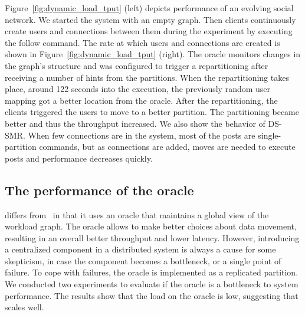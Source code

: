 Figure~\ref{fig:dynamic_load_tput} (left) depicts performance of an evolving social network.  
We started the system with an empty graph. Then clients
continuously create users and connections between them during the experiment
by executing the follow command.
The rate at which users and connections are created is shown in Figure~\ref{fig:dynamic_load_tput} (right).
The oracle monitors changes in the
graph's structure and was configured to trigger a repartitioning after receiving a number of hints
from the partitions.
When the repartitioning takes place, around 122 seconds into the execution, the previously random user mapping got a better location from the oracle.
After the repartitioning, the clients triggered the users to move to a better partition. 
The partitioning became better and thus the throughput increased.
We also show the behavior of DS-SMR.
When few connections are in the system, most of the posts are single-partition commands, but as connections are added, moves are needed to execute posts and performance decreases quickly.


\subsection{The performance of the oracle}

\dynastar differs from \dssmr\ in that it uses an oracle
that maintains a global view of the workload graph. The oracle allows
\dynastar to make better choices about data movement, resulting in an overall
better throughput and lower latency. However, introducing a centralized
component in a distributed system is always a cause for some skepticism,
in case the component becomes a bottleneck, or a single point of failure. 
To cope with failures, the oracle is implemented as a replicated partition. 
We conducted two experiments to evaluate if the \dynastar oracle is a bottleneck to
system performance. The results show that the load on the oracle is
low, suggesting that \dynastar scales well.


